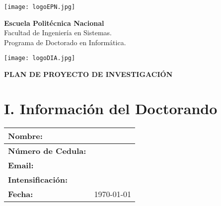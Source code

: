 \documentclass[a4paper,12pt]{article}
\author{Maria Pérez}
\begin{document}

\begin{minipage}{0.15\textwidth}
	\texttt{[image: logoEPN.jpg]} \hspace{0.5cm}
\end{minipage}
\hfill
\begin{minipage}{0.6\textwidth}
	
	\begin{center}

		\large \textbf{Escuela Politécnica Nacional} \\
		\large Facultad de Ingeniería en Sistemas.\\ 
		\large Programa de Doctorado en Informática. \\ 
	\end{center}
\end{minipage}
\hfill
\begin{minipage}{0.15\textwidth}
	\texttt{[image: logoDIA.jpg]} \\ %
\end{minipage}

\vspace{1cm}


\begin{center}
	\huge \textbf{PLAN DE PROYECTO DE INVESTIGACIÓN}
\end{center}
\thispagestyle{empty}  %
\vspace{0.5cm}
\section*{I. Información del Doctorando}
\begin{longtable}{|p{}|p{}|}
	\hline
	\textbf{Nombre:}           &        \\ \hline
	\textbf{Número de Cedula:} &        \\ \hline
	\textbf{Email:}            &        \\ \hline
	\textbf{Intensificación:}  &        \\ \hline
	\textbf{Fecha:}            & \today \\ \hline
\end{longtable}
\end{document}
